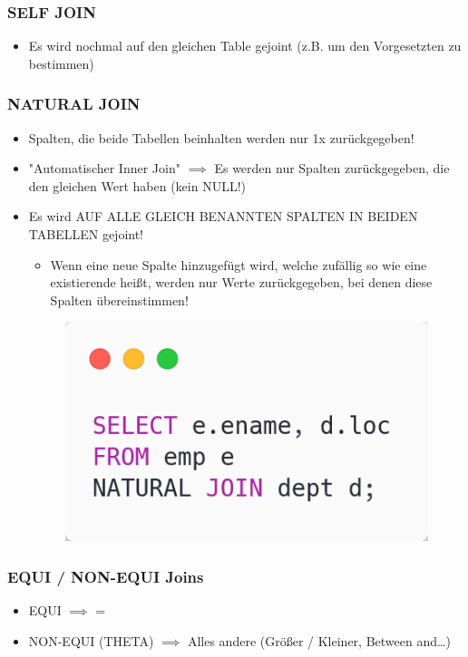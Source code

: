 \subsubsection{SELF JOIN}
\begin{itemize}
    \item Es wird nochmal auf den gleichen Table gejoint (z.B. um den Vorgesetzten zu bestimmen)
\end{itemize}

\subsubsection{NATURAL JOIN}
\begin{itemize}
    \item Spalten, die beide Tabellen beinhalten werden nur 1x zurückgegeben!
    \item "Automatischer Inner Join" $\implies$ Es werden nur Spalten zurückgegeben, die den gleichen Wert haben (kein NULL!)
    \item Es wird AUF ALLE GLEICH BENANNTEN SPALTEN IN BEIDEN TABELLEN gejoint!
    \begin{itemize}
        \item Wenn eine neue Spalte hinzugefügt wird, welche zufällig so wie eine existierende heißt, werden nur Werte zurückgegeben, bei denen diese Spalten übereinstimmen!
    \end{itemize}
    \begin{figure}[H]
        \centering
        \includegraphics[scale=.4]{res/themenkorb_2/natural_join.png} 
    \end{figure}
\end{itemize}

\subsubsection{EQUI / NON-EQUI Joins}
\begin{itemize}
    \item EQUI $\implies$ =
    \item NON-EQUI (THETA) $\implies$ Alles andere (Größer / Kleiner, Between and\dots)
\end{itemize}

